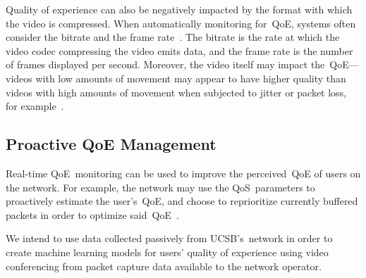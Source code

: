         Quality of experience can also be negatively impacted by the format with which the video is compressed. When automatically monitoring for~QoE, systems often consider the bitrate and the frame rate~\autocite{ChenYanjiao2015FQtQ}. The bitrate is the rate at which the video codec compressing the video emits data, and the frame rate is the number of frames displayed per second. Moreover, the video itself may impact the~QoE---videos with low amounts of movement may appear to have higher quality than videos with high amounts of movement when subjected to jitter or packet loss, for example~\autocite{ChenYanjiao2015FQtQ}.


    \subsection{Proactive QoE Management}\label{introduction:applications:management}
        Real-time QoE~monitoring can be used to improve the perceived~QoE of users on the network. For example, the network may use the QoS~parameters to proactively estimate the user's~QoE, and choose to reprioritize currently buffered packets in order to optimize said~QoE~\autocite{DinakiHosseinEbrahimi2021FVQW}.


    We intend to use data collected passively from UCSB's~network in order to create machine learning models for users' quality of experience using video conferencing from packet capture data available to the network operator.
